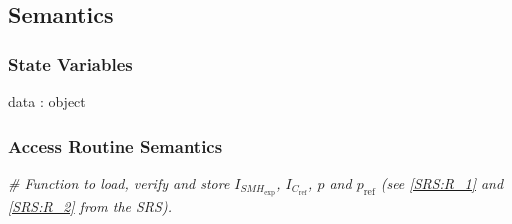 \documentclass[12pt, titlepage]{article}
\begin{document}
\subsection{Semantics}

\subsubsection{State Variables}

data : object

\subsubsection{Access Routine Semantics}

\noindent\textit{{\#} Function to load, verify and store 
$I_{\mathit{SMH}_{\text{exp}}}$, $I_{C_{\text{ref}}}$, $p$ and $p_{\text{ref}}$ 
(see \cref{SRS:R_1} and \cref{SRS:R_2} from the SRS).}
\medskip
\end{document}

